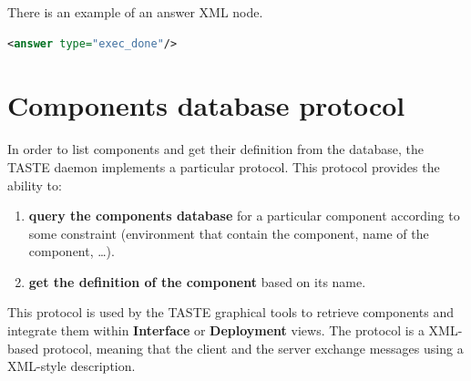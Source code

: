 \documentclass[11pt]{book}
\begin{document}
\begin{itemize}
\begin{itemize}
            \end{itemize}


            There is an example of an answer XML node.
      \begin{lstlisting}[language=xml]
<answer type="exec_done"/>
      \end{lstlisting}
      \end{itemize}


   \section{Components database protocol}
   \label{section-tasted-database-protocol}
   In order to list components and get their definition from the database, the
   TASTE daemon implements a particular protocol. This protocol provides the
   ability to:
   \begin{enumerate}
      \item
         \textbf{query the components database} for a particular component
         according to some constraint (environment that contain the component,
         name of the component, \ldots).
      \item
         \textbf{get the definition of the component} based on its name.
   \end{enumerate}

   This protocol is used by the TASTE graphical tools to retrieve components and
   integrate them within \textbf{Interface} or \textbf{Deployment} views.
   The protocol is a XML-based protocol, meaning that the client and the server
   exchange messages using a XML-style description. 
\end{document}
